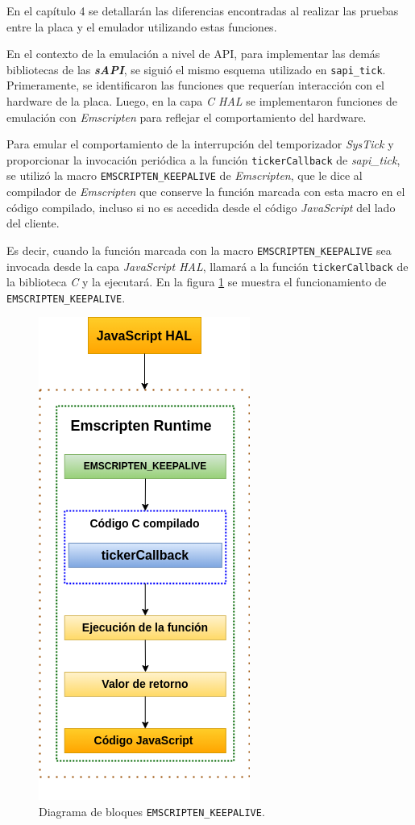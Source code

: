 En el capítulo 4 se detallarán las diferencias encontradas al realizar las pruebas entre la placa y el emulador utilizando estas funciones.

En el contexto de la emulación a nivel de API, para implementar las demás bibliotecas de las \textit{\textbf{sAPI}}, se siguió el mismo esquema utilizado en \texttt{sapi\_tick}. Primeramente, se identificaron las funciones que requerían interacción con el hardware de la placa. Luego, en la capa \textit{C HAL} se implementaron funciones de emulación con \textit{Emscripten} para reflejar el comportamiento del hardware.

Para emular el comportamiento de la interrupción del temporizador \textit{SysTick} y proporcionar la invocación periódica a la función \texttt{tickerCallback} de \textit{sapi\_tick}, se utilizó la macro \texttt{EMSCRIPTEN\_KEEPALIVE} de \textit{Emscripten}, que le dice al compilador de \textit{Emscripten} que conserve la función marcada con esta macro en el código compilado, incluso si no es accedida desde el código \textit{JavaScript} del lado del cliente.

Es decir, cuando la función marcada con la macro \texttt{EMSCRIPTEN\_KEEPALIVE} sea invocada desde la capa \textit{JavaScript HAL}, llamará a la función \texttt{tickerCallback} de la biblioteca \textit{C} y la ejecutará. En la figura \ref{fig:tickerCallback} se muestra el funcionamiento de \texttt{EMSCRIPTEN\_KEEPALIVE}. 

\begin{figure}[ht]
	\centering
	\includegraphics[scale=.55]{./Figures/tickerCallback.png}
	\caption{Diagrama de bloques \texttt{EMSCRIPTEN\_KEEPALIVE}.}
	\label{fig:tickerCallback}
\end{figure}

